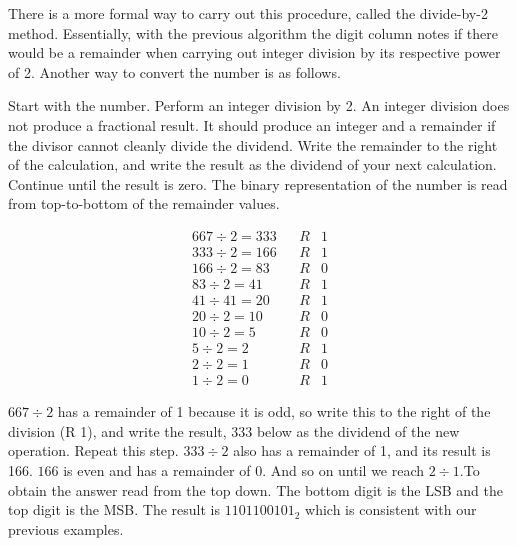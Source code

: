 There is a more formal way to carry out this procedure, called the \gls{divide-by-2} method. Essentially, with the previous 
algorithm the digit column notes if there would be a remainder when carrying out integer division by its respective power of 2. 
Another way to convert the number is as follows.

Start with the number. Perform an integer division by 2. An integer division does not produce a fractional result. It should 
produce an integer and a remainder if the divisor cannot cleanly divide the dividend. Write the remainder to the right of the 
calculation, and write the result as the dividend of your next calculation. Continue until the result is zero. The binary 
representation of the number is read from top-to-bottom of 
the remainder values.

\begin{align*}
	667 \div 2 = 333  	&& R & 1 \\
	333 \div 2 = 166 	&& R & 1 \\
	166 \div 2 = 83 	&& R & 0 \\
	83  \div 2 = 41 	&& R & 1 \\
	41	\div 41 = 20 	&& R & 1 \\
	20 \div 2 = 10 		&& R & 0 \\
	10 \div 2 = 5 		&& R & 0 \\
	5 \div 2 = 2 		&& R & 1 \\
	2 \div 2 = 1 		&& R & 0 \\
	1 \div 2 = 0		&& R & 1
\end{align*}

$667 \div 2$ has a remainder of 1 because it is odd, so write this to the right of the division (R 1), and write the result, 
$333$ below as the dividend of the new operation. Repeat this step. $333 \div 2$ also has a remainder of 1, and its result is 
166. $166$ is even and has a remainder of 0. And so on until we reach $2 \div 1$.To obtain the answer read from the top down. 
The bottom digit is the LSB and the top digit is the MSB. The result is $1101100101_2$ which is consistent with our previous 
examples.

\begin{figure}[t]
\end{figure}

